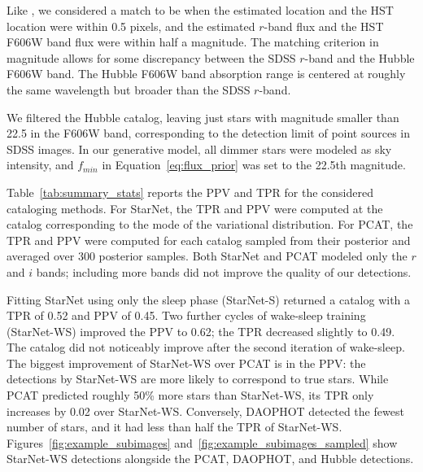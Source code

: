 Like \cite{Portillo_2017, Feder_2019}, we considered a match to be when the estimated location and the HST location were within 0.5 pixels,
and the estimated $r$-band flux and the HST F606W band flux were within half a
magnitude. 
The matching criterion in magnitude allows for some discrepancy between the SDSS $r$-band and the Hubble F606W band. 
The Hubble F606W band absorption range is centered at roughly the same wavelength but broader than the SDSS $r$-band. 


We filtered the Hubble catalog, leaving just stars with magnitude smaller than 22.5 in the F606W band, corresponding to the detection limit of point sources in SDSS images. 
In our generative model, all dimmer stars were modeled as sky intensity, and $f_{min}$ in Equation~\eqref{eq:flux_prior} was set to the 22.5th magnitude. 

Table~\ref{tab:summary_stats} reports the PPV and TPR for the considered cataloging methods.
For StarNet, the TPR and PPV were computed at the catalog corresponding to the mode of the variational distribution. 
For PCAT, the TPR and PPV were computed for each catalog sampled from their posterior and averaged over 300 posterior samples. 
Both StarNet and PCAT modeled only the $r$ and $i$ bands;
including more bands did not improve the quality of our detections. 

Fitting StarNet using only the sleep phase (StarNet-S) returned 
a catalog with a TPR of 0.52 and PPV of 0.45. Two further cycles of wake-sleep training (StarNet-WS) improved the PPV to 0.62; the TPR decreased slightly to 0.49.
The catalog did not noticeably improve after the second iteration of wake-sleep. 
The biggest improvement of StarNet-WS over PCAT is in the PPV: 
the detections by StarNet-WS are more likely to correspond to 
true stars. 
While PCAT predicted roughly 50\% more stars than StarNet-WS, 
its TPR only increases by 0.02 over StarNet-WS. 
Conversely, DAOPHOT detected the fewest number of stars, and it had less than half the TPR of StarNet-WS.
Figures~\ref{fig:example_subimages} and~\ref{fig:example_subimages_sampled} show StarNet-WS detections alongside the PCAT, DAOPHOT, and Hubble detections. 

